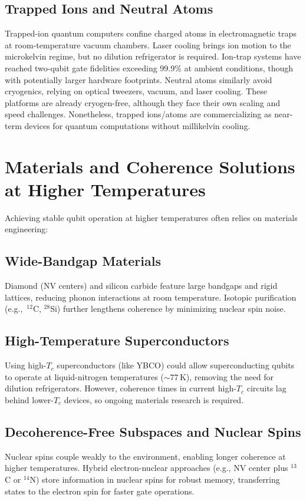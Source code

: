 \documentclass[11pt]{article}
\begin{document}
\subsection{Trapped Ions and Neutral Atoms}
Trapped-ion quantum computers confine charged atoms in electromagnetic traps at room-temperature vacuum chambers. Laser cooling brings ion motion to the microkelvin regime, but no dilution refrigerator is required. Ion-trap systems have reached two-qubit gate fidelities exceeding 99.9\% at ambient conditions, though with potentially larger hardware footprints. Neutral atoms similarly avoid cryogenics, relying on optical tweezers, vacuum, and laser cooling. These platforms are already cryogen-free, although they face their own scaling and speed challenges. Nonetheless, trapped ions/atoms are commercializing as near-term devices for quantum computations without millikelvin cooling.

\section{Materials and Coherence Solutions at Higher Temperatures}

Achieving stable qubit operation at higher temperatures often relies on materials engineering:

\subsection{Wide-Bandgap Materials}
Diamond (NV centers) and silicon carbide feature large bandgaps and rigid lattices, reducing phonon interactions at room temperature. Isotopic purification (e.g., \,$^{12}$C, $^{28}$Si) further lengthens coherence by minimizing nuclear spin noise.

\subsection{High-Temperature Superconductors}
Using high-$T_c$ superconductors (like YBCO) could allow superconducting qubits to operate at liquid-nitrogen temperatures ($\sim77$\,K), removing the need for dilution refrigerators. However, coherence times in current high-$T_c$ circuits lag behind lower-$T_c$ devices, so ongoing materials research is required.

\subsection{Decoherence-Free Subspaces and Nuclear Spins}
Nuclear spins couple weakly to the environment, enabling longer coherence at higher temperatures. Hybrid electron-nuclear approaches (e.g., NV center plus $^{13}$C or $^{14}$N) store information in nuclear spins for robust memory, transferring states to the electron spin for faster gate operations.
\end{document}
